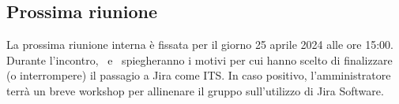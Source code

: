 \subsection{Prossima riunione}
La prossima riunione interna è fissata per il giorno 25 aprile 2024 alle ore 15:00. Durante l'incontro, \riccardo\ e \mattia\ spiegheranno i motivi per cui hanno scelto di finalizzare (o interrompere) il passagio a Jira come ITS. In caso positivo, l'amministratore terrà un breve workshop per allinenare il gruppo sull'utilizzo di Jira Software.